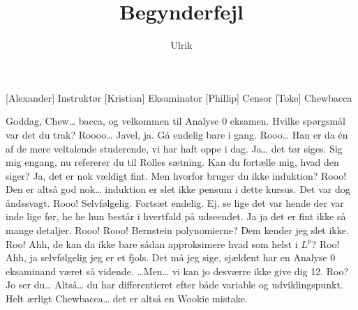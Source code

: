 \documentclass[a4paper,11pt]{article}
\title{Begynderfejl}
\author{Ulrik}
\begin{document}
\maketitle

\begin{roles}
[Alexander] Instruktør
[Kristian] Eksaminator
[Phillip] Censor
[Toke] Chewbacca
\end{roles}

\begin{props}
\end{props}


\begin{sketch}



 Goddag,  Chew… bacca,
og velkommen til Analyse 0 eksamen. Hvilke spørgsmål var det du trak?
 Roooo… 
 Javel, ja.
 Gå endelig bare i gang.
 Rooo… 
 Han er da én af de mere veltalende studerende, vi har haft oppe i dag.
 Ja… det tør siges. Sig mig engang, nu refererer du til Rolles sætning. Kan du fortælle mig, hvad den siger?
 Ja, det er nok vældigt fint. Men hvorfor bruger du ikke induktion?
  Rooo!  
 Den er altså god nok… induktion er slet ikke pensum i dette kursus.
 Det var dog åndssvagt.
 Rooo! 
 Selvfølgelig. Fortsæt endelig.
 Ej, se lige det var hende der var inde lige før, he he hun består i hvertfald på udseendet. Ja ja det er fint ikke så mange detaljer.
 Rooo! Rooo! 
 Bernstein polynomierne? Dem kender jeg slet ikke.
 Roo! 
 Ahh, de kan da ikke bare sådan approksimere hvad som helst i $L^p$?
 Roo! 
 Ahh, ja selvfølgelig jeg er et fjols.
 Det må jeg sige, sjældent har en Analyse 0 eksaminand været så vidende.
 …Men… vi kan jo desværre ikke give dig 12.
  Roo? 
 Jo ser du…
 Altså… du har differentieret efter både variable og udviklingspunkt. Helt ærligt Chewbacca… det er altså en Wookie mistake.


\end{sketch}
\end{document}
